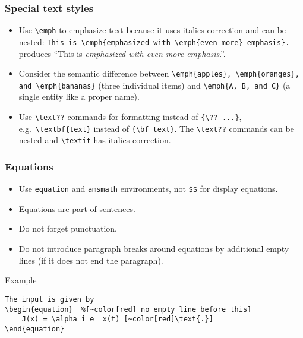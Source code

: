 \documentclass[aspectratio=1610,hyperref={colorlinks,linkcolor=}]{beamer}
\newcommand{\pkg}[1]{\texttt{#1}}
\begin{document}
\begin{frame}[fragile]
    \frametitle{Special text styles}
    \begin{itemize}
        \item Use \verb+\emph+ to emphasize text because it uses italics correction and can be nested: \verb+This is \emph{emphasized with \emph{even more} emphasis}.+ produces ``This is \emph{emphasized with \emph{even more} emphasis}.''.
        \item Consider the semantic difference between \verb+\emph{apples}, \emph{oranges}, and \emph{bananas}+ (three individual items) and \verb+\emph{A, B, and C}+ (a single entity like a proper name).
        \item Use \verb+\text??+ commands for formatting instead of \verb+{\?? ...}+, e.g.~\verb+\textbf{text}+ instead of \verb+{\bf text}+. The \verb+\text??+ commands can be nested and \verb+\textit+ has italics correction.
    \end{itemize}
\end{frame}

\begin{frame}[fragile]
    \frametitle{Equations}
    \begin{itemize}
        \item Use \verb+equation+ and \pkg{amsmath} environments, not \verb+$$+ for display equations.
        \item Equations are part of sentences.
        \item Do not forget punctuation.
        \item Do not introduce paragraph breaks around equations by additional empty lines (if it does not end the paragraph).
    \end{itemize}
    \begin{beamerboxesrounded}{Example}
        \begin{Verbatim}[commandchars=~\[\]]
The input is given by
\begin{equation}  %[~color[red] no empty line before this]
    J(x) = \alpha_i e_ x(t) [~color[red]\text{.}]
\end{equation}
        \end{Verbatim}
    \end{beamerboxesrounded}
\end{frame}
\end{document}
